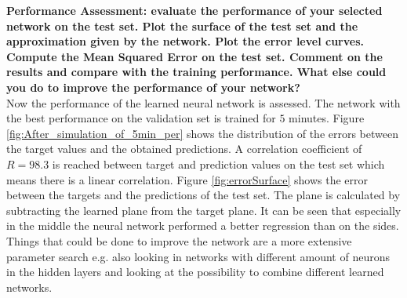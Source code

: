 \documentclass[a4paper,10pt]{article}
\begin{document}
\textbf{Performance Assessment: evaluate the performance of your selected network on the test set. Plot the surface of
	the test set and the approximation given by the network. Plot the error level curves. Compute the Mean Squared
	Error on the test set. Comment on the results and compare with the training performance. What else could you
	do to improve the performance of your network?}\\

Now the performance of the learned neural network is assessed. The network with the best performance on the validation set is trained for $ 5 $ minutes.
Figure \ref{fig:After_simulation_of_5min_per} shows the distribution of the errors between the target values and the obtained predictions. A correlation coefficient of $ R = 98.3 $ is reached between target and prediction values on the test set which means there is a linear correlation. 
Figure \ref{fig:errorSurface} shows the error between the targets and the predictions of the test set. The plane is calculated by subtracting the learned plane from the target plane. It can be seen that especially in the middle the neural network performed a better regression than on the sides. \\
Things that could be done to improve the network are a more extensive parameter search e.g. also looking in networks with different amount of neurons in the hidden layers and looking at the possibility to combine different learned networks. 





\end{document}
